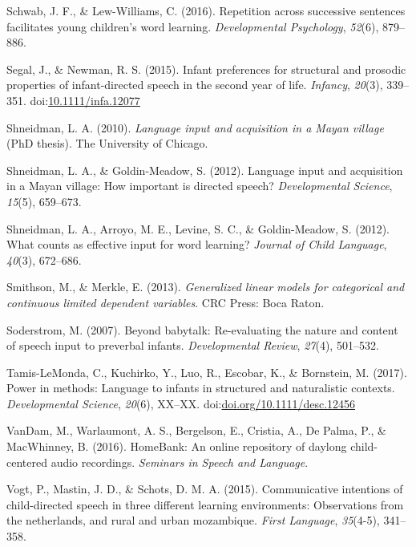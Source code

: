 \documentclass[floatsintext,man]{apa6}
\theoremstyle{definition}
\theoremstyle{definition}
\theoremstyle{definition}
\theoremstyle{remark}
\begin{document}
\hypertarget{ref-schwab2016repetition}{}
Schwab, J. F., \& Lew-Williams, C. (2016). Repetition across successive
sentences facilitates young children's word learning.
\emph{Developmental Psychology}, \emph{52}(6), 879--886.

\hypertarget{ref-segal2015infant}{}
Segal, J., \& Newman, R. S. (2015). Infant preferences for structural
and prosodic properties of infant-directed speech in the second year of
life. \emph{Infancy}, \emph{20}(3), 339--351.
doi:\href{https://doi.org/10.1111/infa.12077}{10.1111/infa.12077}

\hypertarget{ref-shneidman2010language}{}
Shneidman, L. A. (2010). \emph{Language input and acquisition in a Mayan
village} (PhD thesis). The University of Chicago.

\hypertarget{ref-shneidman2012language}{}
Shneidman, L. A., \& Goldin-Meadow, S. (2012). Language input and
acquisition in a Mayan village: How important is directed speech?
\emph{Developmental Science}, \emph{15}(5), 659--673.

\hypertarget{ref-shneidman2012counts}{}
Shneidman, L. A., Arroyo, M. E., Levine, S. C., \& Goldin-Meadow, S.
(2012). What counts as effective input for word learning? \emph{Journal
of Child Language}, \emph{40}(3), 672--686.

\hypertarget{ref-smithson2013generalized}{}
Smithson, M., \& Merkle, E. (2013). \emph{Generalized linear models for
categorical and continuous limited dependent variables}. CRC Press: Boca
Raton.

\hypertarget{ref-soderstrom2007beyond}{}
Soderstrom, M. (2007). Beyond babytalk: Re-evaluating the nature and
content of speech input to preverbal infants. \emph{Developmental
Review}, \emph{27}(4), 501--532.

\hypertarget{ref-tamislemonda2017power}{}
Tamis-LeMonda, C., Kuchirko, Y., Luo, R., Escobar, K., \& Bornstein, M.
(2017). Power in methods: Language to infants in structured and
naturalistic contexts. \emph{Developmental Science}, \emph{20}(6),
XX--XX.
doi:\href{https://doi.org/doi.org/10.1111/desc.12456}{doi.org/10.1111/desc.12456}

\hypertarget{ref-HomeBank}{}
VanDam, M., Warlaumont, A. S., Bergelson, E., Cristia, A., De Palma, P.,
\& MacWhinney, B. (2016). HomeBank: An online repository of daylong
child-centered audio recordings. \emph{Seminars in Speech and Language}.

\hypertarget{ref-vogt2015communicative}{}
Vogt, P., Mastin, J. D., \& Schots, D. M. A. (2015). Communicative
intentions of child-directed speech in three different learning
environments: Observations from the netherlands, and rural and urban
mozambique. \emph{First Language}, \emph{35}(4-5), 341--358.
\end{document}
